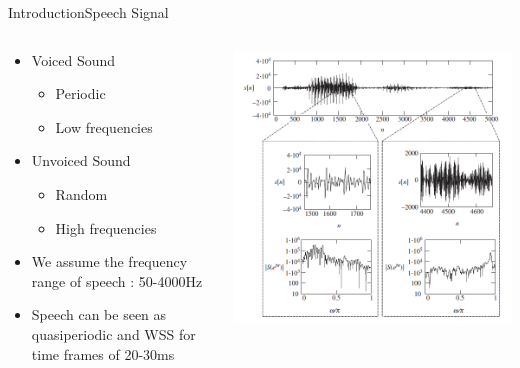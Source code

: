 \begin{frame}{Introduction}{Speech Signal}
	\begin{center}
	\begin{columns}
		\begin{column}{0.5\textwidth}
		\begin{itemize}		
		\item Voiced Sound
			\begin{itemize}
				\item Periodic 
				\item Low frequencies
			\end{itemize}
		\end{itemize}
		\begin{itemize}
		\item Unvoiced Sound 
			\begin{itemize}
				\item Random
				\item High frequencies
			\end{itemize}	
		\item We assume the frequency range of speech : 50-4000Hz 
		\item Speech can be seen as quasiperiodic and WSS for time frames of 20-30ms 	
	    \end{itemize}
	    \end{column}	
	    \begin{column}{0.5\textwidth} 
	    \includegraphics[width=1\textwidth]{figures/VoicedvsUnvoiced}
		\end{column}
	\end{columns}
	\end{center}
\end{frame}

